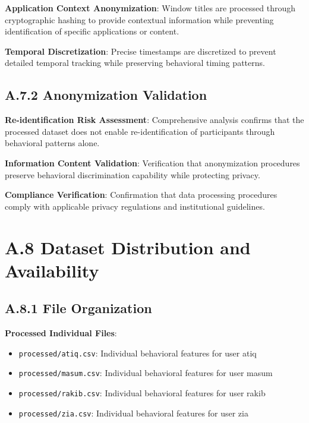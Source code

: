 \documentclass[
  12pt,
  a4paper,
]{report}
\providecommand{\tightlist}{%
  \setlength{\itemsep}{0pt}\setlength{\parskip}{0pt}}
\begin{document}
\textbf{Application Context Anonymization}: Window titles are processed
through cryptographic hashing to provide contextual information while
preventing identification of specific applications or content.

\textbf{Temporal Discretization}: Precise timestamps are discretized to
prevent detailed temporal tracking while preserving behavioral timing
patterns.

\subsection{A.7.2 Anonymization
Validation}\label{a.7.2-anonymization-validation}

\textbf{Re-identification Risk Assessment}: Comprehensive analysis
confirms that the processed dataset does not enable re-identification of
participants through behavioral patterns alone.

\textbf{Information Content Validation}: Verification that anonymization
procedures preserve behavioral discrimination capability while
protecting privacy.

\textbf{Compliance Verification}: Confirmation that data processing
procedures comply with applicable privacy regulations and institutional
guidelines.

\section{A.8 Dataset Distribution and
Availability}\label{a.8-dataset-distribution-and-availability}

\subsection{A.8.1 File Organization}\label{a.8.1-file-organization}

\textbf{Processed Individual Files}:

\begin{itemize}
\tightlist
\item
  \texttt{processed/atiq.csv}: Individual behavioral features for user
  atiq
\item
  \texttt{processed/masum.csv}: Individual behavioral features for user
  masum
\item
  \texttt{processed/rakib.csv}: Individual behavioral features for user
  rakib
\item
  \texttt{processed/zia.csv}: Individual behavioral features for user
  zia
\end{itemize}
\end{document}
